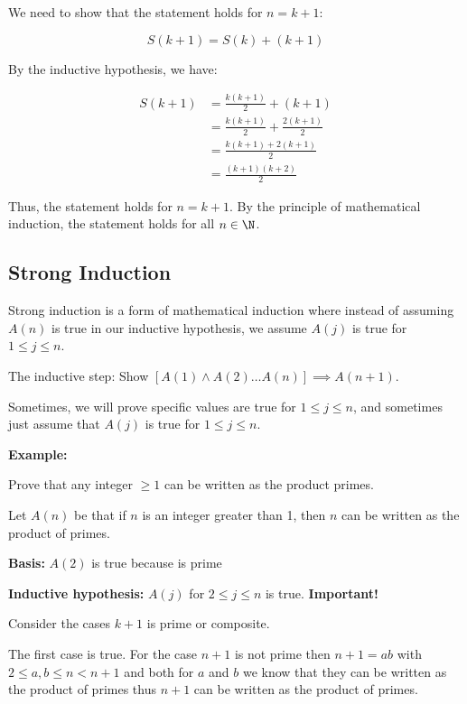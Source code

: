 We need to show that the statement holds for \( n = k + 1 \):

\[
	S(k+1) = S(k) + (k + 1)
\]
	
By the inductive hypothesis, we have:

\begin{align*}
	S(k+1) &= \frac{k(k+1)}{2} + (k + 1) \\
	&= \frac{k(k+1)}{2} + \frac{2(k + 1)}{2}\\
    &= \frac{k(k+1) + 2(k + 1)}{2} \\
	&= \frac{(k + 1)(k + 2)}{2}	
\end{align*}

Thus, the statement holds for \( n = k + 1 \).
By the principle of mathematical induction, the statement holds for all \( n \in \N \).

\QED

\subsection{Strong Induction}

Strong induction is a form of mathematical induction where instead of assuming \(A(n)\) is true in our 
inductive hypothesis, we assume \(A(j)\) is true for \(1 \le j \le n\). 

The inductive step: Show \([A(1) \land A(2) \dots A(n)] \implies A(n + 1)\). 

Sometimes, we will prove specific values are true for \(1 \le j \le n\), and sometimes just assume that 
\(A(j)\) is true for \(1 \le j \le n\). 

\textbf{Example:}

Prove that any integer \(\ge 1\) can be written as the product primes.

Let \(A(n)\) be that if \(n\) is an integer greater than 1, then \(n\) can be written as the product of 
primes. 

\textbf{Basis: } \(A(2)\) is true because is prime 

\textbf{Inductive hypothesis:} \(A(j)\) for \(2 \le j \le n\) is true. \textbf{Important!}

Consider the cases \(k + 1\) is prime or composite. 

The first case is true.
For the case \(n + 1\) is not prime then \(n + 1 = ab\) with \(2 \le a,b \le n < n + 1\) and both 
for \(a\) and \(b\) we know that they can be written as the product of primes thus 
\(n + 1\) can be written as the product of primes. 

\QED

